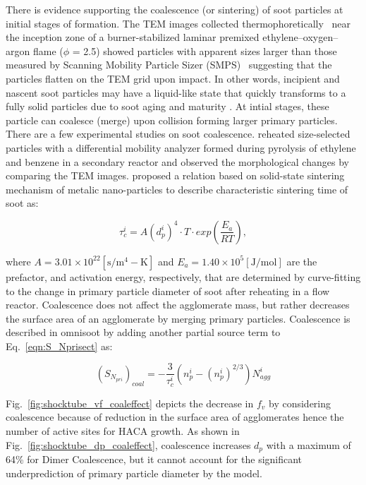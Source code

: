 There is evidence supporting the coalescence (or sintering) of soot particles at initial stages of formation. The TEM images collected thermophoretically~\citep{zhao2007comparative} near the inception zone of a burner-stabilized laminar premixed ethylene–oxygen–argon flame ($\phi$ = 2.5) showed particles with apparent sizes larger than those measured by Scanning Mobility Particle Sizer (SMPS)~\citep{oktem2005chemical} suggesting that the particles flatten on the TEM grid upon impact. In other words, incipient and nascent soot particles may have a liquid-like state that quickly transforms to a fully solid particles due to soot aging and maturity \citep{kholghy2016core}. At intial stages, these particle can coalesce (merge) upon collision forming larger primary particles. There are a few experimental studies on soot coalescence. \citet{ono2017experimental} reheated size-selected particles with a differential mobility analyzer formed during pyrolysis of ethylene and benzene in a secondary reactor and observed the morphological changes by comparing the TEM images. \citet{matsukawa2023experimental} proposed a relation based on solid-state sintering mechanism of metalic nano-particles to describe characteristic sintering time of soot as:

\begin{equation}
	\tau^i_c = A (d^i_p)^4 \cdot T \cdot exp(\frac{E_a}{RT}),
	\label{eqn:coalcharactime}
\end{equation}

\noindent where $A=3.01×10^{22} \mathrm{[s/m^4-K]}$ and $E_a = 1.40×10^5 \mathrm{[J/mol]}$ are the prefactor, and activation energy, respectively, that are determined by curve-fitting to the change in primary particle diameter of soot after reheating in a flow reactor. Coalescence does not affect the agglomerate mass, but rather decreases the surface area of an agglomerate by merging primary particles. Coalescence is described in omnisoot by adding another partial source term to Eq.~\ref{eqn:S_Nprisect} as:

\begin{equation}
	\left(S_{N_{pri}}\right)_{coal} = 
	- \frac{3}{\tau^i_c}
	\left(
		n^i_p - \left(n^i_p\right)^{2/3}
	\right) N^i_{agg}
	\label{eqn:S_Npricoal}
\end{equation}

Fig.~\ref{fig:shocktube_vf_coaleffect} depicts the decrease in $f_v$ by considering coalescence because of reduction in the surface area of agglomerates hence the number of active sites for HACA growth. As shown in Fig.~\ref{fig:shocktube_dp_coaleffect}, coalescence increases $d_p$ with a maximum of 64\% for Dimer Coalescence, but it cannot account for the significant underprediction of primary particle diameter by the model.

